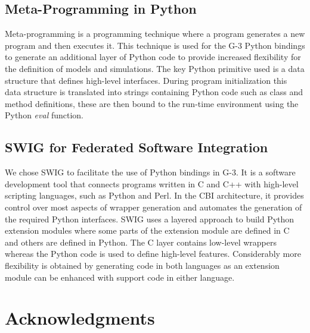 \documentclass[10pt]{article}
\begin{document}

\subsection*{Meta-Programming in Python}

Meta-programming is a programming technique where a program generates
a new program and then executes it.  This technique is used for the G-3
Python bindings to generate an additional layer of Python code to
provide increased flexibility for the definition of models and
simulations.  The key Python primitive used is a data structure that
defines high-level interfaces.  During program initialization this
data structure is translated into strings containing Python code such as
class and method definitions, these are then bound to the run-time
environment using the Python {\it eval} function.

\subsection*{SWIG for Federated Software Integration}

We chose SWIG to facilitate the use of Python bindings in G-3. It is
a software development tool that connects programs written in C and
C++ with high-level scripting languages, such as Python and Perl. In
the CBI architecture, it provides control over most aspects of wrapper
generation and automates the generation of the required Python
interfaces. SWIG uses a layered approach to build Python extension
modules where some parts of the extension module are defined in C and
others are defined in Python. The C layer contains low-level wrappers
whereas the Python code is used to define high-level features.
Considerably more flexibility is obtained by generating code in both
languages as an extension module can be enhanced with support code in
either language.

\section*{Acknowledgments}



\end{document}
